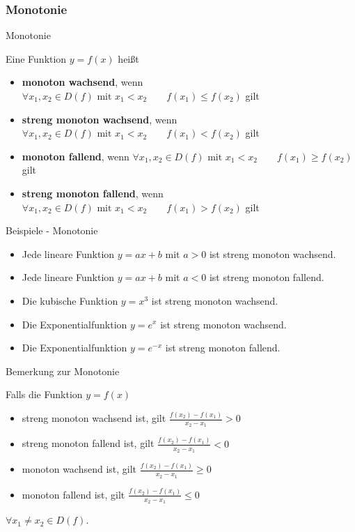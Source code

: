 \subsubsection{Monotonie}
\begin{frame}{Monotonie}
	\begin{definition}
		Eine Funktion $y=f(x)$ heißt
		\begin{itemize}
			\item \textbf{monoton wachsend}, wenn $\forall  x_{1}, x_{2} \in D(f) \mbox{ mit } x_{1} < x_{2}  \qquad f(x_{1}) \leq f(x_{2})$ gilt
			\item \textbf{streng monoton wachsend}, wenn $\forall  x_{1}, x_{2} \in D(f) \mbox{ mit } x_{1} < x_{2}  \qquad f(x_{1}) < f(x_{2})$ gilt
			\item \textbf{monoton fallend}, wenn $\forall  x_{1}, x_{2} \in D(f) \mbox{ mit } x_{1} < x_{2}  \qquad f(x_{1}) \geq f(x_{2})$ gilt
			\item \textbf{streng monoton fallend}, wenn $\forall  x_{1}, x_{2} \in D(f) \mbox{ mit } x_{1} < x_{2}  \qquad f(x_{1}) > f(x_{2})$ gilt
						
		\end{itemize}
	\end{definition}
\end{frame}

\begin{frame}{Beispiele - Monotonie}
	\begin{example}
		\begin{itemize}
			\item Jede lineare Funktion $y = a x + b$ mit $a>0$ ist streng monoton wachsend.
			\item Jede lineare Funktion $y = a x + b$ mit $a<0$ ist streng monoton fallend.
			\item Die kubische Funktion $y=x^3$ ist streng monoton wachsend.
			\item Die Exponentialfunktion $y=e^{x}$ ist streng monoton wachsend.
			\item Die Exponentialfunktion $y=e^{-x}$ ist streng monoton fallend.
		\end{itemize}
	\end{example}
\end{frame}

\begin{frame}{Bemerkung zur Monotonie}
	\begin{bemerkung}
		Falls die Funktion $y=f(x)$
		\begin{itemize}
			\item streng monoton wachsend ist, gilt $\frac{f(x_{2}) - f(x_{1})}{x_{2} - x_{1}} > 0$ 
			\item streng monoton fallend ist, gilt
			$\frac{f(x_{2}) - f(x_{1})}{x_{2} - x_{1}} < 0$
			\item monoton wachsend ist, gilt
			$\frac{f(x_{2}) - f(x_{1})}{x_{2} - x_{1}} \geq 0$ 
			\item monoton fallend ist, gilt
			$\frac{f(x_{2}) - f(x_{1})}{x_{2} - x_{1}} \leq 0$ 
		\end{itemize}
		$\forall x_{1} \neq x_{2} \in D(f)$.
	\end{bemerkung}
\end{frame}

